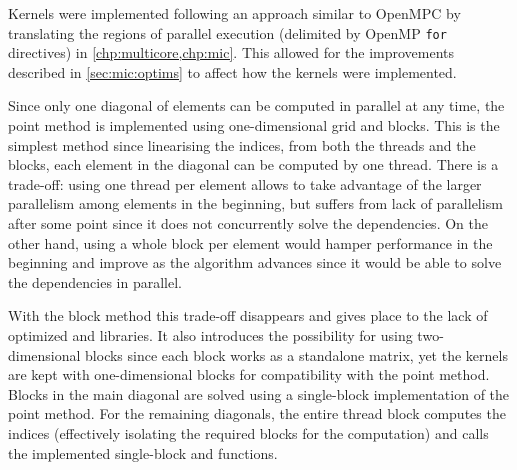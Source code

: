 \documentclass[../thesis]{subfiles}
\begin{document}
	Kernels were implemented following an approach similar to OpenMPC by translating the regions of parallel execution (delimited by OpenMP \texttt{for} directives) in \cref{chp:multicore,chp:mic}. This allowed for the improvements described in \cref{sec:mic:optims} to affect how the kernels were implemented.

	Since only one diagonal of elements can be computed in parallel at any time, the point method is implemented using one-dimensional grid and blocks. This is the simplest method since linearising the indices, from both the threads and the blocks, each element in the diagonal can be computed by one thread. There is a trade-off: using one thread per element allows to take advantage of the larger parallelism among elements in the beginning, but suffers from lack of parallelism after some point since it does not concurrently solve the dependencies. On the other hand, using a whole block per element would hamper performance in the beginning and improve as the algorithm advances since it would be able to solve the dependencies in parallel.

	With the block method this trade-off disappears and gives place to the lack of optimized \blas and \lapack libraries. It also introduces the possibility for using two-dimensional blocks since each block works as a standalone matrix, yet the kernels are kept with one-dimensional blocks for compatibility with the point method. Blocks in the main diagonal are solved using a single-block implementation of the point method. For the remaining diagonals, the entire thread block computes the indices (effectively isolating the required blocks for the computation) and calls the implemented single-block \blas and \lapack functions.
\end{document}
